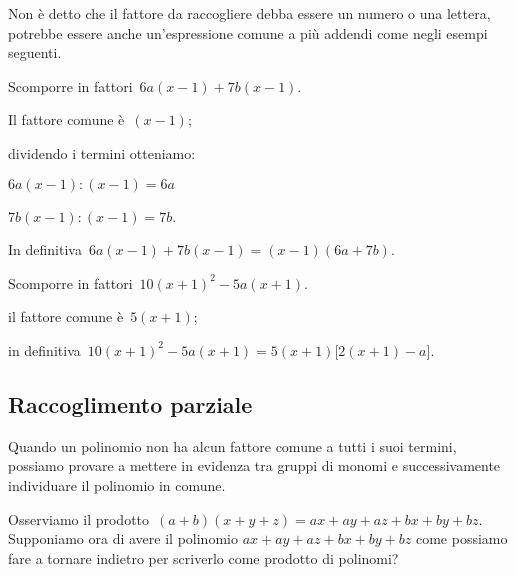 Non è detto che il fattore da raccogliere debba essere un numero o una lettera, 
potrebbe essere anche un'espressione comune a più addendi come negli esempi 
seguenti.



 \begin{esempio}
Scomporre in fattori~\(6a(x-1)+7b(x-1)\).
  \begin{enumeratea}
  \item Il fattore comune è~\((x-1)\); 
  \item dividendo i termini otteniamo:
   \begin{itemize*}
    \item \(6a(x-1):(x-1)=6a\)
    \item \(7b(x-1):(x-1)=7b\).
   \end{itemize*}
  \end{enumeratea}
  \item In definitiva~\(6a(x-1)+7b(x-1)=(x-1)(6a+7b)\).
 \end{esempio}

 \begin{esempio}
Scomporre in fattori~\(10(x+1)^{2}-5a(x+1)\).
  \begin{enumeratea}
  \item il fattore comune è~\(5(x+1)\);
  \item in definitiva~\(10(x+1)^{2}-5a(x+1)=5(x+1)\bigl[2(x+1)-a \bigr]\).
  \end{enumeratea}
 \end{esempio}


% 

\subsection{Raccoglimento parziale}
\label{subsec:divpol_raccoglimentoparziale}

Quando un polinomio non ha alcun fattore comune a tutti i suoi termini, 
possiamo provare a mettere in evidenza tra gruppi di monomi
e successivamente individuare il polinomio in comune.

Osserviamo il prodotto~\((a+b)(x+y+z)=ax+ay+az+bx+by+bz\). Supponiamo ora di 
avere il polinomio \(ax+ay+az+bx+by+bz\) come possiamo fare a tornare indietro 
per scriverlo come prodotto di polinomi?

